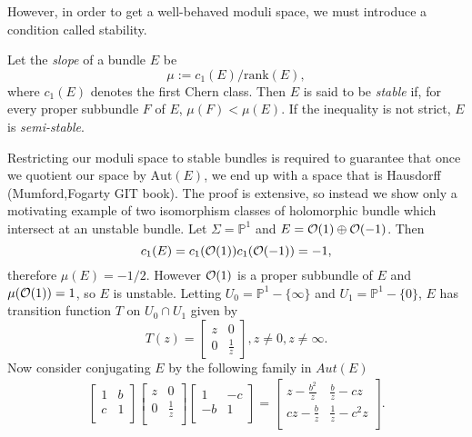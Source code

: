 	However, in order to get a well-behaved moduli space, we must introduce a condition called stability. 
	\begin{definition}
		Let the \emph{slope} of a bundle $E$ be
		$$\mu := c_1(E)/\text{rank}(E),$$
		where $c_1(E)$ denotes the first Chern class. Then $E$ is said to be \textit{stable} if, for every proper subbundle $F$ of $E$, $\mu(F) < \mu(E)$. If the inequality is not strict, $E$ is \textit{semi-stable}.
	\end{definition}
	Restricting our moduli space to stable bundles is required to guarantee that once we quotient our space by $\text{Aut}(E)$, we end up with a space that is Hausdorff (Mumford,Fogarty GIT book). The proof is extensive, so instead we show only a motivating example of two isomorphism classes of holomorphic bundle which intersect at an unstable bundle. Let $\Sigma = \mathbb{P}^1$ and $E = \mathcal{O}(1)\oplus \mathcal{O}(-1)$. Then
	\begin{equation}
	c_1(E) = c_1(\mathcal{O}(1))c_1(\mathcal{O}(-1)) = -1,
	\end{equation} 
	therefore $\mu(E) = -1/2$. However $\mathcal{O}(1)$ is a proper subbundle of $E$ and $\mu(\mathcal{O}(1)) = 1$, so $E$ is unstable. Letting $U_0 = \mathbb{P}^1 - \{\infty\}$ and $U_1 = \mathbb{P}^1 - \{0\}$, $E$ has transition function $T$ on $U_0 \cap U_1$ given by
	\begin{equation*}
	T(z) = \begin{bmatrix}
	z & 0\\
	0 & \frac{1}{z}
	\end{bmatrix}, z \neq 0, z\neq \infty.
	\end{equation*}
	Now consider conjugating $E$ by the following family in $Aut(E)$
	\begin{align*}
	\begin{bmatrix}
	1 & b\\
	c & 1\\
	\end{bmatrix}
	\begin{bmatrix}
	z & 0\\
	0 & \frac{1}{z}\\
	\end{bmatrix}
	\begin{bmatrix}
	1 & -c\\
	-b & 1\\
	\end{bmatrix} = \begin{bmatrix}
	z - \frac{b^2}{z} & \frac{b}{z}-cz\\
	cz - \frac{b}{z} & \frac{1}{z}-c^2 z\\
	\end{bmatrix}.
	\end{align*}
